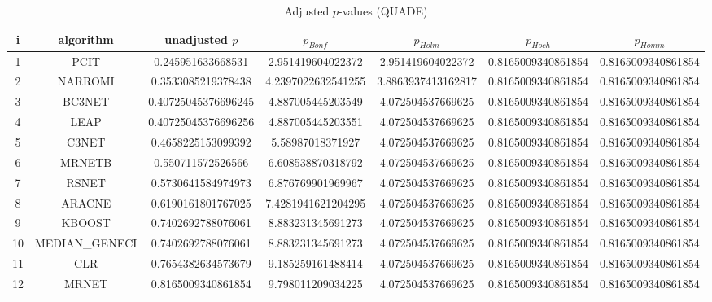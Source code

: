 \documentclass[a4paper,10pt]{article}
\begin{document}
\begin{landscape}
\begin{table}[!htp]
\centering\scriptsize
\caption{Adjusted $p$-values (QUADE)}
\begin{tabular}{ccccccc}
i&algorithm&unadjusted $p$&$p_{Bonf}$&$p_{Holm}$&$p_{Hoch}$&$p_{Homm}$\\
\hline
1&PCIT&0.245951633668531&2.951419604022372&2.951419604022372&0.8165009340861854&0.8165009340861854\\
2&NARROMI&0.3533085219378438&4.2397022632541255&3.8863937413162817&0.8165009340861854&0.8165009340861854\\
3&BC3NET&0.40725045376696245&4.887005445203549&4.072504537669625&0.8165009340861854&0.8165009340861854\\
4&LEAP&0.40725045376696256&4.887005445203551&4.072504537669625&0.8165009340861854&0.8165009340861854\\
5&C3NET&0.4658225153099392&5.58987018371927&4.072504537669625&0.8165009340861854&0.8165009340861854\\
6&MRNETB&0.550711572526566&6.608538870318792&4.072504537669625&0.8165009340861854&0.8165009340861854\\
7&RSNET&0.5730641584974973&6.876769901969967&4.072504537669625&0.8165009340861854&0.8165009340861854\\
8&ARACNE&0.6190161801767025&7.4281941621204295&4.072504537669625&0.8165009340861854&0.8165009340861854\\
9&KBOOST&0.7402692788076061&8.883231345691273&4.072504537669625&0.8165009340861854&0.8165009340861854\\
10&MEDIAN_GENECI&0.7402692788076061&8.883231345691273&4.072504537669625&0.8165009340861854&0.8165009340861854\\
11&CLR&0.7654382634573679&9.185259161488414&4.072504537669625&0.8165009340861854&0.8165009340861854\\
12&MRNET&0.8165009340861854&9.798011209034225&4.072504537669625&0.8165009340861854&0.8165009340861854\\
\hline
\end{tabular}
\end{table}


\end{landscape}
\end{document}
